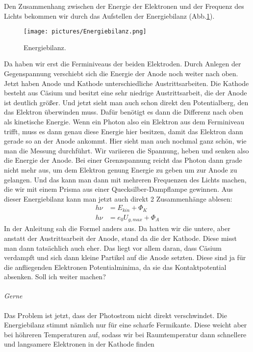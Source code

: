 Den Zusammenhang zwischen der Energie der Elektronen und der Frequenz des Lichts bekommen wir durch das Aufstellen der Energiebilanz 
(Abb.\ref{fig:Energiebilanz}). 
\begin{figure}[H]
    \centering
    \texttt{[image: pictures/Energiebilanz.png]}
    \caption{Energiebilanz. \cite{AP02}}
    \label{fig:Energiebilanz}
\end{figure}
\noindent 
Da haben wir erst die Ferminiveaus der beiden Elektroden. Durch Anlegen der Gegenspannung verschiebt sich die Energie der Anode noch weiter
nach oben. Jetzt haben Anode und Kathode unterschiedliche Austrittsarbeiten. Die Kathode besteht aus Cäsium und besitzt eine sehr niedrige 
Austrittsarbeit, die der Anode ist deutlich größer. Und jetzt sieht man auch schon direkt den Potentialberg, den das Elektron überwinden muss.
Dafür benötigt es dann die Differenz nach oben als kinetische Energie. Wenn ein Photon also ein Elektron aus dem Ferminiveau trifft, muss es 
dann genau diese Energie hier besitzen, damit das Elektron dann gerade so an der Anode ankommt. Hier sieht man auch nochmal ganz schön, wie 
man die Messung durchführt. Wir variieren die Spannung, heben und senken also die Energie der Anode. Bei einer Grenzspannung reicht das 
Photon dann grade nicht mehr aus, um dem Elektron genung Energie zu geben um zur Anode zu gelangen. Und das kann man dann mit mehreren Frequenzen 
des Lichts machen, die wir mit einem Prisma aus einer Quecksilber-Dampflampe gewinnen. Aus dieser Energiebilanz kann man jetzt auch direkt 
2 Zusammenhänge ablesen:
\begin{align}
    h\nu&=E_{kin}+\Phi_K \\
    h\nu&=e_0U_{g,max}+\Phi_A \label{eqn:Einstein}
\end{align}
In der Anleitung sah die Formel anders aus. Da hatten wir die untere, aber anstatt der Austrittsarbeit der Anode, stand da die der Kathode. 
Diese misst man dann tatsächlich auch eher. Das liegt vor allem daran, dass Cäsium verdampft und sich dann kleine Partikel auf die Anode 
setzten. Diese sind ja für die anfliegenden Elektronen Potentialminima, da sie das Kontaktpotential absenken. 
Soll ich weiter machen? 
\\\\\noindent
\textit{Gerne}
\\\\\noindent
Das Problem ist jetzt, dass der Photostrom nicht direkt verschwindet. Die Energiebilanz stimmt nämlich nur für eine scharfe Fermikante. 
Diese weicht aber bei höhreren Temperaturen auf, sodass wir bei Raumtemperatur dann schnellere und langsamere Elektronen in der Kathode finden

